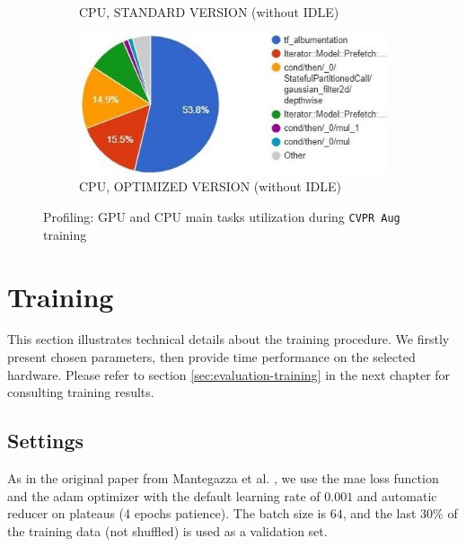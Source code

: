 \begin{figure}[!h]
\begin{center}
\begin{subfigure}[h]{0.49\textwidth}
			\caption[]{CPU, STANDARD VERSION (without IDLE)}
		\end{subfigure}
		\hfill
		\begin{subfigure}[h]{0.49\textwidth}
			\centering
			\includegraphics[width=1\textwidth]{"contents/images/05-profiling-CVPRaug-opt-cpu"}
			\caption[]{CPU, OPTIMIZED VERSION (without IDLE)}
		\end{subfigure}
	\end{center}
	\caption[Profiling: GPU and CPU main tasks utilization during \texttt{CVPR Aug} training]{Profiling: GPU and CPU main tasks utilization during \texttt{CVPR Aug} training}
	\label{fig:profiling-cvpraug-gpu}
\end{figure}






\section{Training}
\label{sec:implementation-training}

This section illustrates technical details about the training procedure. We firstly present chosen parameters, then provide time performance on the selected hardware. Please refer to section \ref{sec:evaluation-training} in the next chapter for consulting training results.



\subsection{Settings}
\label{subsec:training-params}


As in the original paper from Mantegazza et al. \cite{mantegazza2019visionbased}, we use the \gls{mae} loss function and the \gls{adam} optimizer \cite{kingma2014adam} with the default learning rate of $0.001$ and automatic reducer on plateaus (4 epochs patience). The batch size is $64$, and the last 30\% of the training data (not shuffled) is used as a validation set.

